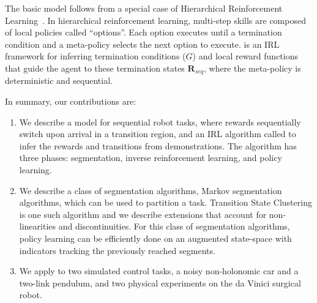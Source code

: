 The basic model follows from a special case of Hierarchical Reinforcement Learning~\citep{suttonPS99}.
In hierarchical reinforcement learning, multi-step skills are composed of local policies called ``options''. Each option executes until a termination condition and a meta-policy selects the next option to execute.
\hirl is an IRL framework for inferring termination conditions ($G$) and local reward functions that guide the agent to these termination states $\mathbf{R}_{seq}$, where the meta-policy is deterministic and sequential.


In summary, our contributions are:
\begin{enumerate}
\item We describe a model for sequential robot tasks, where rewards sequentially switch upon arrival in a transition region, and an IRL algorithm called \hirlfull to infer the rewards and transitions from demonstrations. The algorithm has three phases: segmentation, inverse reinforcement learning, and policy learning.
\item We describe a class of segmentation algorithms, Markov segmentation algorithms, which can be used to partition a task. Transition State Clustering is one such algorithm and we describe extensions that account for non-linearities and discontinuities. For this class of segmentation algorithms, policy learning can be efficiently done on an augmented state-space with indicators tracking the previously reached segments.
\item We apply \hirl to two simulated control tasks, a noisy non-holonomic car and a two-link pendulum, and two physical experiments on the da Vinici surgical robot.
\end{enumerate}


